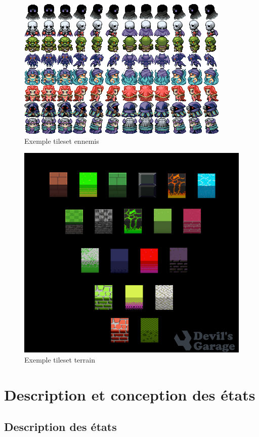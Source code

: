 \documentclass[a4paper,12pt]{article}
\begin{document}
    \begin{figure}[ht]
        \centering
        \includegraphics{monsters-32x32.png}
        \caption{Exemple tileset ennemis}
    \end{figure}
    
    \begin{figure}[ht]
        \centering
        \includegraphics[width=\textwidth]{field.png}
        \caption{Exemple tileset terrain}
    \end{figure}


\clearpage
\section{Description et conception des états}

\subsection{Description des états}
\end{document}
